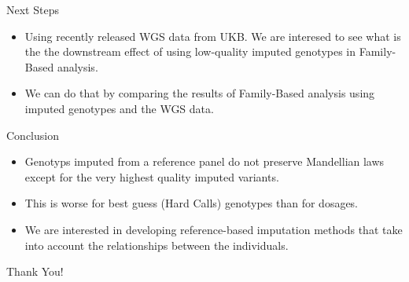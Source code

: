 \documentclass{beamer}
\begin{document}
\begin{frame}{Next Steps}
      \begin{itemize}
            \item Using recently released WGS data from UKB. We are interesed to see what is the 
            the downstream effect of using low-quality imputed genotypes in Family-Based analysis.
            \vspace{10pt}
            \item We can do that by comparing the results of Family-Based analysis using imputed genotypes and the WGS data.
      \end{itemize}
\end{frame}

\begin{frame}{Conclusion}
    \begin{itemize}
      \item Genotyps imputed from a reference panel do not preserve Mandellian laws except for the very highest quality imputed variants.
      \vspace{10pt}
      \item This is worse for best guess (Hard Calls) genotypes than for dosages.
      \vspace{10pt}
      \item We are interested in developing reference-based imputation methods that take into account the relationships between the individuals.
    \end{itemize}
\end{frame}


\begin{frame}[plain]
      \centering
      \huge{Thank You!}
\end{frame}
\end{document}
